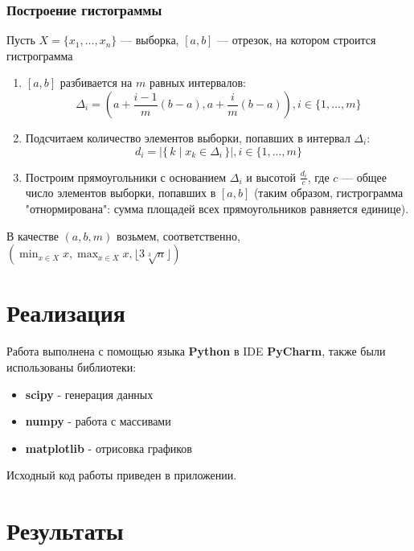 \documentclass[12pt,a4paper]{article}
\newcommand\Set[2]{\{\,#1\mid#2\,\}}
\newcommand{\floor}[1]{\lfloor #1 \rfloor}
\begin{document}
\subsubsection{Построение гистограммы}
Пусть $X = \{x_1,...,x_n\}$ — выборка, $[a,b]$ — отрезок, на котором строится гистрограмма 
\begin{enumerate}
    \item $[a,b]$ разбивается на $m$ равных интервалов:
    \begin{equation}
        \Delta_i = (a+\frac{i-1}{m}(b-a), a+\frac{i}{m}(b-a)), i \in \{1,...,m\}
    \end{equation}
    
    \item Подсчитаем количество элементов выборки, попавших в интервал $\Delta_i$:
    \begin{equation}
        d_i =|\Set{k}{x_k\in\Delta_i}|, i \in \{1,...,m\}
    \end{equation}
    
    \item Построим прямоугольники с основанием $\Delta_i$ и высотой $\frac{d_i}{c}$, где $c$ — общее число элементов выборки, попавших в $[a,b]$ (таким образом, гистрограмма "отнормирована": сумма площадей всех прямоугольников равняется единице).
\end{enumerate}

В качестве $(a, b, m)$ возьмем, соответственно, $(\min_{x \in X} x, \max_{x \in X} x, \floor{3\sqrt[3]{n}})$ 

\pagebreak

\section{Реализация}
Работа выполнена с помощью языка \textbf{Python} в IDE \textbf{PyCharm}, также были использованы библиотеки:

\begin{itemize}
	\item \textbf{scipy} - генерация данных
	\item \textbf{numpy} - работа с массивами
	\item \textbf{matplotlib} - отрисовка графиков
\end{itemize}

Исходный код работы приведен в приложении.
\pagebreak

\section{Результаты}
\end{document}
